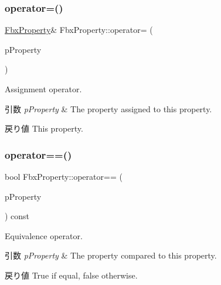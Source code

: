 \subsubsection{\texorpdfstring{operator=()}{operator=()}}
{\footnotesize\ttfamily \hyperlink{class_fbx_property}{Fbx\+Property}\& Fbx\+Property\+::operator= (\begin{DoxyParamCaption}\item[{const \hyperlink{class_fbx_property}{Fbx\+Property} \&}]{p\+Property }\end{DoxyParamCaption})}

Assignment operator. 
\begin{DoxyParams}{引数}
{\em p\+Property} & The property assigned to this property. \\
\hline
\end{DoxyParams}
\begin{DoxyReturn}{戻り値}
This property. 
\end{DoxyReturn}
\mbox{\label{class_fbx_property_a5c68be7d9ec048949e5f0b489e1f687c}} 
\subsubsection{\texorpdfstring{operator==()}{operator==()}\hspace{0.1cm}{\footnotesize\ttfamily [1/2]}}
{\footnotesize\ttfamily bool Fbx\+Property\+::operator== (\begin{DoxyParamCaption}\item[{const \hyperlink{class_fbx_property}{Fbx\+Property} \&}]{p\+Property }\end{DoxyParamCaption}) const}

Equivalence operator. 
\begin{DoxyParams}{引数}
{\em p\+Property} & The property compared to this property. \\
\hline
\end{DoxyParams}
\begin{DoxyReturn}{戻り値}
{\ttfamily True} if equal, {\ttfamily false} otherwise. 
\end{DoxyReturn}
\mbox{\label{class_fbx_property_a027c88dfbe6dc8283307ec81edf79159}} 
